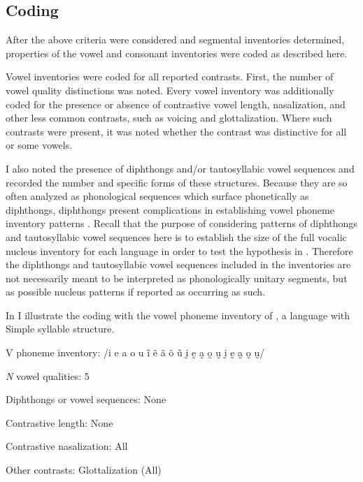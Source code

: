 \subsection{Coding}\label{sec:4.2.2}

  After the above criteria were considered and segmental inventories determined, properties of the vowel and consonant inventories were coded as described here.

  Vowel inventories were coded for all reported contrasts. First, the number of vowel quality distinctions was noted. Every vowel inventory was additionally coded for the presence or absence of contrastive vowel length, nasalization, and other less common contrasts, such as voicing and glottalization. Where such contrasts were present, it was noted whether the contrast was distinctive for all or some vowels. 

  I also noted the presence of diphthongs and/or tautosyllabic vowel sequences and recorded the number and specific forms of these structures. Because they are so often analyzed as phonological sequences which surface phonetically as diphthongs, diphthongs present complications in establishing vowel phoneme inventory patterns \citep[133]{Maddieson1984}. Recall that the purpose of considering patterns of diphthongs and tautosyllabic vowel sequences here is to establish the size of the full vocalic nucleus inventory for each language in order to test the hypothesis in . Therefore the diphthongs and tautosyllabic vowel sequences included in the inventories are not necessarily meant to be interpreted as phonologically unitary segments, but as possible nucleus patterns if reported as occurring as such.

  In  I illustrate the coding with the vowel phoneme inventory of , a language with Simple syllable structure.

\ea\label{ex:4.9}
\begin{Coding}
\item[V phoneme inventory:] /i e a o u ĩ  ẽ  ã  õ  ũ  ḭ  ḛ  a̰  o̰  ṵ ḭ ḛ  a̰  o̰  ṵ/
\item[\textit{N} vowel qualities:] 5
\item[Diphthongs or vowel sequences:] None
\item[Contrastive length:] None
\item[Contrastive nasalization:] All
\item[Other contrasts:] Glottalization (All)
\end{Coding}
\z

